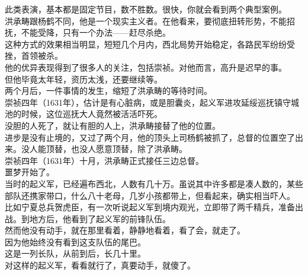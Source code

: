 \begin{multicols}{\theparacolNo}
此类表演，基本都是固定节目，数不胜数。很快，你就会看到两个典型案例。\\

洪承畴跟杨鹤不同，他是一个现实主义者。在他看来，要彻底扭转形势，不能招抚，不能受降，只有一个办法——赶尽杀绝。\\

这种方式的效果相当明显，短短几个月内，西北局势开始稳定，各路民军纷纷受挫，首领被杀。\\

他的优异表现得到了很多人的关注，包括崇祯。对他而言，高升是迟早的事。\\

但他毕竟太年轻，资历太浅，还要继续等。\\

两个月后，一件事情的发生，缩短了洪承畴的等待时间。\\

崇祯四年（1631年），估计是有心脏病，或是胆囊炎，起义军进攻延绥巡抚镇守城池的时候，这位巡抚大人竟然被活活吓死。\\

没胆的人死了，就让有胆的人上，洪承畴接替了他的位置。\\

进步是没有止境的，又过了两个月，他的顶头上司杨鹤被抓了，总督的位置空了出来。没人能顶替，也没人愿意顶替，除了洪承畴。\\

崇祯四年（1631年）十月，洪承畴正式接任三边总督。\\

噩梦开始了。\\

当时的起义军，已经遍布西北，人数有几十万。虽说其中许多都是凑人数的，某些部队还携家带口，什么八十老母，几岁小孩都带上，但看起来，确实相当吓人。\\

比如宁夏总兵贺虎臣，有一次听说起义军到境内观光，立即带了两千精兵，准备出战。到地方后，他看到了起义军的前锋队伍。\\

然而他没有动手，就在那里看着，静静地看着，看了会，就走了。\\

因为他始终没有看到这支队伍的尾巴。\\

这是一列长队，从前到后，长几十里。\\

对这样的起义军，看看就行了，真要动手，就傻了。\\


\end{multicols}
